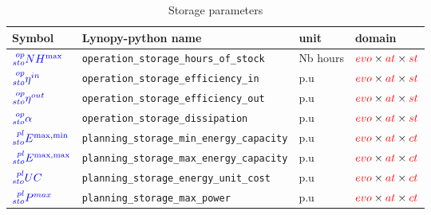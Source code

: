 \documentclass{article}
\begin{document}
\begin{table}[h]
\footnotesize
\centering

\caption{Storage parameters}
\begin{tabular}{llll}
\hline
    \textbf{Symbol} & \textbf{Lynopy-python name} & \textbf{unit}  & \textbf{domain} \\ \hline
    
    $\textcolor{blue}{\prescript{op}{sto}{NH^{\max}}}$&  \verb|operation_storage_hours_of_stock| & Nb hours & $\textcolor{red}{evo}  \times \textcolor{red}{at} \times \textcolor{red}{st} $ \\ 
    
    $\textcolor{blue}{\prescript{op}{sto}{\eta^{in}}}$&  \verb|operation_storage_efficiency_in| & p.u & $\textcolor{red}{evo}  \times \textcolor{red}{at} \times \textcolor{red}{st} $  \\ 
    
    $\textcolor{blue}{\prescript{op}{sto}{\eta^{out}}}$&  \verb|operation_storage_efficiency_out| & p.u & $\textcolor{red}{evo}  \times \textcolor{red}{at} \times \textcolor{red}{st} $  \\    
    
    $\textcolor{blue}{\prescript{op}{sto}{\alpha}}$&  \verb|operation_storage_dissipation| & p.u & $\textcolor{red}{evo}  \times \textcolor{red}{at} \times \textcolor{red}{st} $  \\  \hline
    
    $\textcolor{blue}{\prescript{pl}{sto}{E^{\max,\min}}}$&  \verb|planning_storage_min_energy_capacity| & p.u & $\textcolor{red}{evo}  \times \textcolor{red}{at} \times \textcolor{red}{ct} $   \\ 
    
    $\textcolor{blue}{\prescript{pl}{sto}{E^{\max,\max}}}$ & \verb|planning_storage_max_energy_capacity| & p.u & $\textcolor{red}{evo}  \times \textcolor{red}{at} \times \textcolor{red}{ct} $ \\
    
    $\textcolor{blue}{\prescript{pl}{sto}{UC}}$ & \verb|planning_storage_energy_unit_cost| & p.u & $\textcolor{red}{evo}  \times \textcolor{red}{at} \times \textcolor{red}{ct} $  \\
    
    $\textcolor{blue}{\prescript{pl}{sto}{P^{max}}}$ & \verb|planning_storage_max_power| & p.u & $\textcolor{red}{evo}  \times \textcolor{red}{at} \times \textcolor{red}{ct} $ \\ \hline
    
  \end{tabular}
\end{table}
\end{document}
